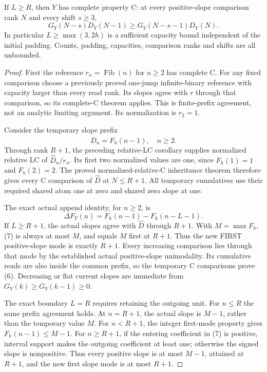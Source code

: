 \begin{theorem}
If $L\ge R$, then $Y$ has complete property C: at every
positive-slope comparison rank $N$ and every shift $s\ge3$,
\[
           G_Y(N-s)D_Y(N-1)\ge G_Y(N-s-1)D_Y(N).        \tag{6}
\]
In particular $L\ge\max(3,2h)$ is a sufficient capacity bound
independent of the initial padding.  Counts, padding, capacities,
comparison ranks and shifts are all unbounded.
\end{theorem}
\begin{proof}
First the reference $r_n=\operatorname{Fib}(n)$ for $n\ge2$
has complete C.  For any fixed comparison choose a previously proved
one-jump infinite-binary reference with capacity larger than every
read rank.  Its slopes agree with $r$ through that comparison,
so its complete-C theorem applies.  This is finite-prefix agreement,
not an analytic limiting argument.  Its normalization is $r_2=1$.

Consider the temporary slope prefix
\[
                      \widehat D_n=F_h(n-1),\quad n\ge2.
\]
Through rank $R+1$, the preceding relative-LC corollary supplies
normalized relative LC of $\widehat D_n/r_n$.
Its first two normalized values are one, since
$F_h(1)=1$ and $F_h(2)=2$.
The proved normalized-relative-C inheritance theorem therefore
gives every C comparison of $\widehat D$ at $N\le R+1$.
All temporary cumulatives use their required shared atom one at
zero and shared zero slope at one.

The exact actual append identity, for $n\ge2$, is
\[
 \Delta F_Y(n)=F_h(n-1)-F_h(n-L-1).                    \tag{7}
\]
If $L\ge R+1$, the actual slopes agree with $\widehat D$
through $R+1$.  With $M=\max F_h$, (7) is always at most
$M$, and equals $M$ first at $R+1$.  Thus the new FIRST
positive-slope mode is exactly $R+1$.
Every increasing comparison lies through that mode by the established
actual positive-slope unimodality.  Its cumulative reads are also
inside the common prefix, so the temporary C comparisons prove (6).
Decreasing or flat current slopes are immediate from $G_Y(k)\ge
G_Y(k-1)\ge0$.

The exact boundary $L=R$ requires retaining the outgoing unit.
For $n\le R$ the same prefix agreement holds.  At $n=R+1$,
the actual slope is $M-1$, rather than the temporary value $M$.
For $n<R+1$, the integer first-mode property gives
$F_h(n-1)\le M-1$.
For $n\ge R+1$, if the entering coefficient in (7) is positive,
interval support makes the outgoing coefficient at least one;
otherwise the signed slope is nonpositive.  Thus every positive
slope is at most $M-1$, attained at $R+1$, and the new first
slope mode is at most $R+1$.


\end{proof}
